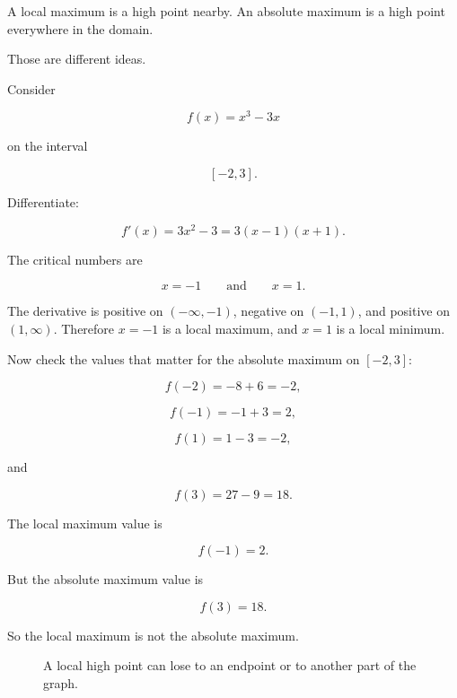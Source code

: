 A local maximum is a high point nearby.  An absolute maximum is a high point
everywhere in the domain.

Those are different ideas.

Consider

\[
f(x)=x^3-3x
\]

on the interval

\[
[-2,3].
\]

Differentiate:

\[
f'(x)=3x^2-3=3(x-1)(x+1).
\]

The critical numbers are

\[
x=-1
\qquad\text{and}\qquad
x=1.
\]

The derivative is positive on \((-\infty,-1)\), negative on \((-1,1)\), and positive
on \((1,\infty)\).  Therefore \(x=-1\) is a local maximum, and \(x=1\) is a local
minimum.

Now check the values that matter for the absolute maximum on \([-2,3]\):

\[
f(-2)=-8+6=-2,
\]

\[
f(-1)=-1+3=2,
\]

\[
f(1)=1-3=-2,
\]

and

\[
f(3)=27-9=18.
\]

The local maximum value is

\[
f(-1)=2.
\]

But the absolute maximum value is

\[
f(3)=18.
\]

So the local maximum is not the absolute maximum.

\begin{figure}[h]
\centering
{}
\caption{A local high point can lose to an endpoint or to another part of the graph.}
\label{fig:local-max-not-absolute}
\end{figure}

